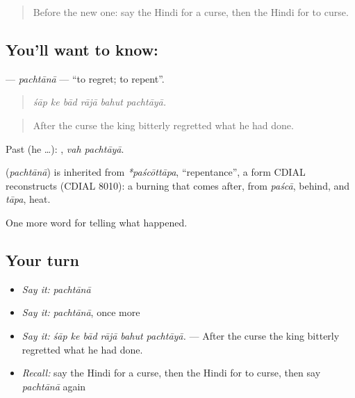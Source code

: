 \label{lesson:HI-C336-pachtana}



\begin{quote}
Before the new one: say the Hindi for a curse, then the Hindi for to curse.
\end{quote}

\subsection*{You'll want to know: }
\textbf{} — \emph{pachtānā} — \textquotedblleft{}to regret; to repent\textquotedblright{}.

\begin{quote}
     
\end{quote}

\begin{quote}
\emph{śāp ke bād rājā bahut pachtāyā.}
\end{quote}

\begin{quote}
After the curse the king bitterly regretted what he had done.
\end{quote}

Past (he …):  , \emph{vah pachtāyā}.

\begin{cousinweb}
\textbf{} (\emph{pachtānā}) is inherited from \emph{*paścōttāpa}, \textquotedblleft{}repentance\textquotedblright{}, a form CDIAL reconstructs (CDIAL 8010): a burning that comes after, from \emph{paścā}, behind, and \emph{tāpa}, heat.
\end{cousinweb}

\begin{grammarlens}[title={What you've built}]
One more word for telling what happened.
\end{grammarlens}

\subsection*{Your turn}
\begin{itemize}
\raggedright
  \item \emph{Say it:} \emph{pachtānā}
  \item \emph{Say it:} \emph{pachtānā}, once more
  \item \emph{Say it:} \emph{śāp ke bād rājā bahut pachtāyā.} — After the curse the king bitterly regretted what he had done.
  \item \emph{Recall:} say the Hindi for a curse, then the Hindi for to curse, then say \emph{pachtānā} again
\end{itemize}

